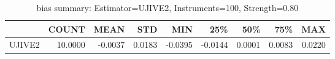 \begin{table}[ht]
\centering
\caption{bias summary: Estimator=UJIVE2, Instruments=100, Strength=0.80}
\begin{tabular}{lrrrrrrrr}
\toprule
 & COUNT & MEAN & STD & MIN & 25\% & 50\% & 75\% & MAX \\
\midrule
UJIVE2 & 10.0000 & -0.0037 & 0.0183 & -0.0395 & -0.0144 & 0.0001 & 0.0083 & 0.0220 \\
\bottomrule
\end{tabular}
\end{table}
